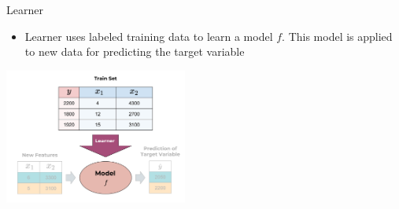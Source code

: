 \documentclass[11pt,compress,t,notes=noshow, xcolor=table]{beamer}
\begin{document}
\begin{vbframe}{Learner}
\newpage

\begin{itemize}
\item Learner uses labeled training data to learn a model $f$. This model is applied to new data for predicting the target variable
\end{itemize}

 \begin{center}
    \includegraphics[width = 0.45\textwidth]{figure_man/the_inducer_web.png}
  \end{center}

\end{vbframe}
\end{document}
